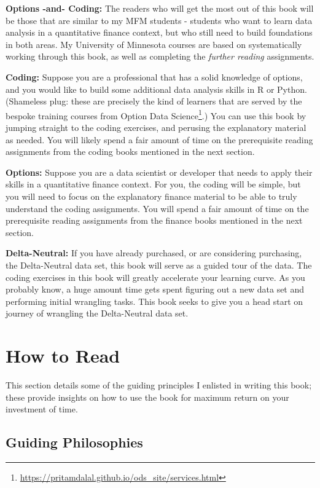 \documentclass[11pt,]{krantz}
\renewcommand{\href}[2]{#2\footnote{\url{#1}}}
\begin{document}
\textbf{Options -and- Coding:} The readers who will get the most out of this book will be those that are similar to my MFM students - students who want to learn data analysis in a quantitative finance context, but who still need to build foundations in both areas. My University of Minnesota courses are based on systematically working through this book, as well as completing the \emph{further reading} assignments.

\textbf{Coding:} Suppose you are a professional that has a solid knowledge of options, and you would like to build some additional data analysis skills in R or Python. (Shameless plug: these are precisely the kind of learners that are served by the bespoke training courses from \href{https://pritamdalal.github.io/ods_site/services.html}{Option Data Science}.) You can use this book by jumping straight to the coding exercises, and perusing the explanatory material as needed. You will likely spend a fair amount of time on the prerequisite reading assignments from the coding books mentioned in the next section.

\textbf{Options:} Suppose you are a data scientist or developer that needs to apply their skills in a quantitative finance context. For you, the coding will be simple, but you will need to focus on the explanatory finance material to be able to truly understand the coding assignments. You will spend a fair amount of time on the prerequisite reading assignments from the finance books mentioned in the next section.

\textbf{Delta-Neutral:} If you have already purchased, or are considering purchasing, the Delta-Neutral data set, this book will serve as a guided tour of the data. The coding exercises in this book will greatly accelerate your learning curve. As you probably know, a huge amount time gets spent figuring out a new data set and performing initial wrangling tasks. This book seeks to give you a head start on journey of wrangling the Delta-Neutral data set.

\section{How to Read}\label{how-to-read}

This section details some of the guiding principles I enlisted in writing this book; these provide insights on how to use the book for maximum return on your investment of time.

\subsection{Guiding Philosophies}\label{guiding-philosophies}
\end{document}
